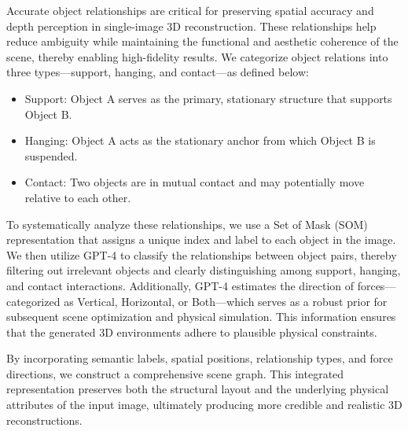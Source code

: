 
Accurate object relationships are critical for preserving spatial accuracy and depth perception in single-image 3D reconstruction. These relationships help reduce ambiguity while maintaining the functional and aesthetic coherence of the scene, thereby enabling high-fidelity results. We categorize object relations into three types—support, hanging, and contact—as defined below:
\begin{itemize}
    \item Support: Object A serves as the primary, stationary structure that supports Object B.
    \item Hanging: Object A acts as the stationary anchor from which Object B is suspended.
    \item Contact: Two objects are in mutual contact and may potentially move relative to each other.
\end{itemize}
To systematically analyze these relationships, we use a Set of Mask (SOM) representation that assigns a unique index and label to each object in the image. We then utilize GPT-4 to classify the relationships between object pairs, thereby filtering out irrelevant objects and clearly distinguishing among support, hanging, and contact interactions. Additionally, GPT-4 estimates the direction of forces—categorized as Vertical, Horizontal, or Both—which serves as a robust prior for subsequent scene optimization and physical simulation. This information ensures that the generated 3D environments adhere to plausible physical constraints.

By incorporating semantic labels, spatial positions, relationship types, and force directions, we construct a comprehensive scene graph. This integrated representation preserves both the structural layout and the underlying physical attributes of the input image, ultimately producing more credible and realistic 3D reconstructions.


